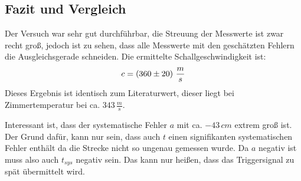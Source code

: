 \subsection{Fazit und Vergleich}
Der Versuch war sehr gut durchführbar, die Streuung der Messwerte ist zwar recht groß, jedoch ist zu sehen, dass alle Messwerte mit den geschätzten Fehlern die Ausgleichsgerade schneiden. Die ermittelte Schallgeschwindigkeit ist:
\begin{align}
c = \left( 360 \pm 20 \right)\, \frac{m}{s} \notag
\end{align}
Dieses Ergebnis ist identisch zum Literaturwert, dieser liegt bei Zimmertemperatur bei ca. \(343\, \frac{m}{s}\).

Interessant ist, dass der systematische Fehler \(a\) mit ca. \(-43\, cm\) extrem groß ist. Der Grund dafür, kann nur sein, dass auch \(t\) einen signifikanten systematischen Fehler enthält da die Strecke nicht so ungenau gemessen wurde.  Da \(a\) negativ ist muss also auch \(t_{sys}\) negativ sein. Das kann nur heißen, dass das Triggersignal zu spät übermittelt wird.